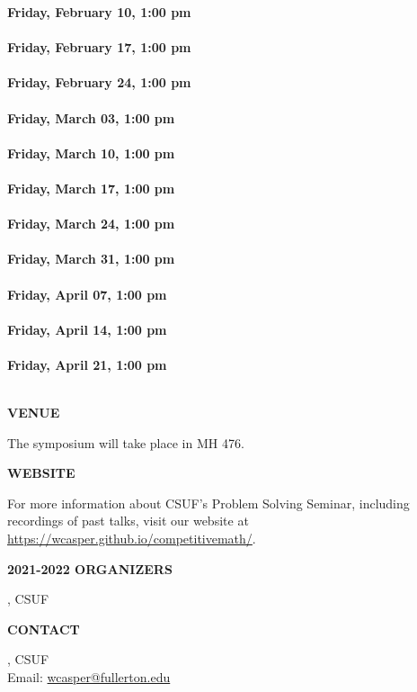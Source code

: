 \documentclass[a4paper]{article}
\begin{document}
\begin{minipage}{0.95\textwidth}
\begin{minipage}[b]{0.47\textwidth}
{\leavevmode \raggedright
\textbf{\color{cprimary}Friday, February 10, 1:00 pm}\\ \\
\textbf{\color{cprimary}Friday, February 17, 1:00 pm}\\ \\
\textbf{\color{cprimary}Friday, February 24, 1:00 pm}\\ \\
\textbf{\color{cprimary}Friday, March 03, 1:00 pm}\\ \\
\textbf{\color{cprimary}Friday, March 10, 1:00 pm}\\ \\
\textbf{\color{cprimary}Friday, March 17, 1:00 pm}\\ \\
\textbf{\color{cprimary}Friday, March 24, 1:00 pm}\\ \\
\textbf{\color{cprimary}Friday, March 31, 1:00 pm}\\ \\
\textbf{\color{cprimary}Friday, April 07, 1:00 pm}\\ \\
\textbf{\color{cprimary}Friday, April 14, 1:00 pm}\\ \\
\textbf{\color{cprimary}Friday, April 21, 1:00 pm}\\ \\
\par{}
}

\vspace{0.2in}
\medskip

\large{\color{csecondary}\textbf{VENUE}}

The symposium will take place in MH 476.

\medskip

\large{\color{csecondary}\textbf{WEBSITE}}

For more information about CSUF's Problem Solving Seminar, including recordings of past talks, visit our website at\\ \href{https://wcasper.github.io/competitivemath/}{https://wcasper.github.io/competitivemath/}.

\medskip
\textbf{\color{csecondary}\large 2021-2022 ORGANIZERS}\par
{}, CSUF

\medskip

\textbf{\color{csecondary}\large CONTACT }\par

, CSUF\\
Email: \href{mailto:wcasper@fullerton.edu}{wcasper@fullerton.edu}

\rule{0pt}{78pt}
\end{minipage}
\vspace*{-70pt}

\end{minipage}
\end{document}
